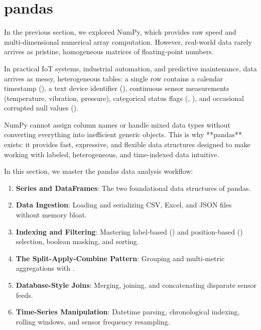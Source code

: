 \section{pandas}\label{sec:pandas}

In the previous section, we explored NumPy, which provides raw speed and multi-dimensional numerical array computation. However, real-world data rarely arrives as pristine, homogeneous matrices of floating-point numbers.

In practical IoT systems, industrial automation, and predictive maintenance, data arrives as messy, heterogeneous tables: a single row contains a calendar timestamp (), a text device identifier (), continuous sensor measurements (temperature, vibration, pressure), categorical status flags (, ), and occasional corrupted null values ().

NumPy cannot assign column names or handle mixed data types without converting everything into inefficient generic objects. This is why **pandas** exists: it provides fast, expressive, and flexible data structures designed to make working with labeled, heterogeneous, and time-indexed data intuitive.

In this section, we master the pandas data analysis workflow:
\begin{enumerate}
    \item \textbf{Series and DataFrames}: The two foundational data structures of pandas.
    \item \textbf{Data Ingestion}: Loading and serializing CSV, Excel, and JSON files without memory bloat.
    \item \textbf{Indexing and Filtering}: Mastering label-based () and position-based () selection, boolean masking, and sorting.
    \item \textbf{The Split-Apply-Combine Pattern}: Grouping and multi-metric aggregations with .
    \item \textbf{Database-Style Joins}: Merging, joining, and concatenating disparate sensor feeds.
    \item \textbf{Time-Series Manipulation}: Datetime parsing, chronological indexing, rolling windows, and sensor frequency resampling.
\end{enumerate}

